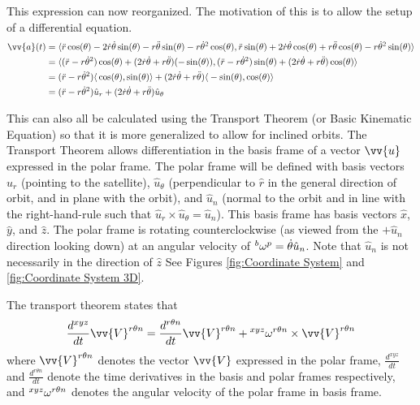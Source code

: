 \documentclass[../basicOrbitalDynamics.tex]{subfiles}
\begin{document}
This expression can now reorganized. The motivation of this is to allow the setup of a differential equation.
\begin{align*}
    \vv{a}(t) & =\langle{}\ddot{r}\cos(\theta)-2\dot{r}\dot{\theta}\sin(\theta)-r\ddot{\theta}\sin(\theta)-r\dot{\theta}^2\cos(\theta), \ddot{r}\sin(\theta)+2\dot{r}\dot{\theta}\cos(\theta)+r\ddot{\theta}\cos(\theta)-r\dot{\theta}^2\sin(\theta)\rangle{} \\
              & =\langle{}(\ddot{r}-r\dot{\theta}^2)\cos(\theta)+(2\dot{r}\dot{\theta}+r\ddot{\theta})(-\sin(\theta)), (\ddot{r}-r\dot{\theta}^2)\sin(\theta)+(2\dot{r}\dot{\theta}+r\ddot{\theta})\cos(\theta)\rangle{}                                      \\
              & =(\ddot{r}-r\dot{\theta}^2)\langle{}\cos(\theta),\sin(\theta)\rangle{}+(2\dot{r}\dot{\theta}+r\ddot{\theta})\langle{}-\sin(\theta), \cos(\theta)\rangle{}                                                                                     \\
              & =(\ddot{r}-r\dot{\theta}^2)\hat{u}_r+(2\dot{r}\dot{\theta}+r\ddot{\theta})\hat{u}_\theta
\end{align*}

This can also all be calculated using the Transport Theorem (or Basic Kinematic Equation) so that it is more generalized to allow for inclined orbits. The Transport Theorem allows differentiation in the basis frame of a vector $\vv{u}$ expressed in the polar frame. The polar frame will be defined with basis vectors $\hat{u}_r$ (pointing to the satellite), $\hat{u}_\theta$ (perpendicular to $\hat{r}$ in the general direction of orbit, and in plane with the orbit), and $\hat{u}_n$ (normal to the orbit and in line with the right-hand-rule such that $\hat{u}_r\times\hat{u}_\theta=\hat{u}_n$). This basis frame has basis vectors $\hat{x}$, $\hat{y}$, and $\hat{z}$. The polar frame is rotating counterclockwise (as viewed from the $+\hat{u}_n$ direction looking down) at an angular velocity of $\prescript{b}{}{\omega}^{p}=\dot{\theta}\hat{u}_n$. Note that $\hat{u}_n$ is not necessarily in the direction of $\hat{z}$ See Figures \ref{fig:Coordinate System} and \ref{fig:Coordinate System 3D}.

The transport theorem states that
$$\frac{d^{xyz}}{dt}{\vv{V}^{r\theta{}n}}=\frac{d^{r\theta n}}{dt}{\vv{V}^{r\theta{}n}}+\prescript{xyz}{}{\omega}^{r\theta{}n}\times{}\vv{V}^{r\theta{}n}$$
where $\vv{V}^{r\theta{}n}$ denotes the vector $\vv{V}$ expressed in the polar frame, $\frac{d^{xyz}}{dt}$ and $\frac{d^{r\theta{}n}}{dt}$ denote the time derivatives in the basis and polar frames respectively, and $\prescript{xyz}{}{\omega}^{r\theta{}n}$ denotes the angular velocity of the polar frame in basis frame.
\end{document}
